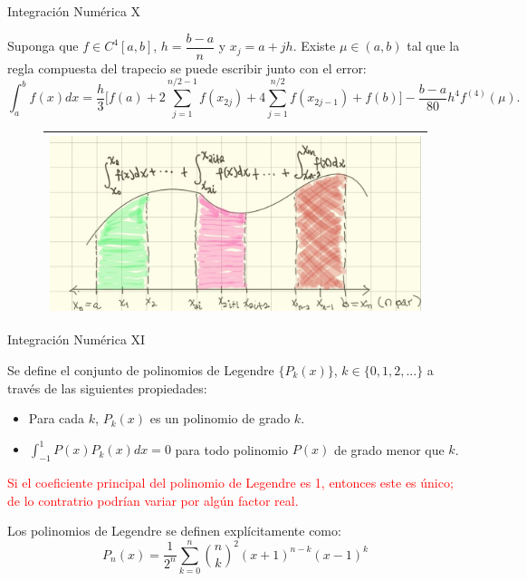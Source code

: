 \begin{frame}{Integración Numérica X}
\begin{Teo}
Suponga que $f\in C^4[a,b]$, $h=\dfrac{b-a}{n}$ y $x_j=a+jh$. Existe $\mu\in(a,b)$ tal que la regla compuesta del trapecio se puede escribir junto con el error:
$$\int_{a}^{b}f(x)dx=\dfrac{h}{3}\bigg[ 	f(a)+2\sum_{j=1}^{n/2-1}f(x_{2j})+4\sum_{j=1}^{n/2}f(x_{2j-1})+f(b)\bigg]-\dfrac{b-a}{80}h^4f^{(4)}(\mu).$$
\end{Teo}
\begin{figure}[H]
\centering
\begin{tabular}{|c|}
\hline
\includegraphics[scale=0.15]{Imagen11}\\
\hline
\end{tabular}
\end{figure}
\end{frame}
\begin{frame}{Integración Numérica XI}
\begin{Def}
Se define el conjunto de polinomios de Legendre $\{P_k(x)\}$, $k \in \{0,1,2,...\}$ a través de las siguientes propiedades:
\begin{itemize}
\item Para cada $k$, $P_k(x)$ es un polinomio de grado $k$.
\item $\displaystyle \int_{-1}^{1}P(x)P_k(x)dx=0 $ para todo polinomio $P(x)$ de grado menor que $k$. 
\end{itemize}
\end{Def}\pause
\textcolor{red}{Si el coeficiente principal del polinomio de Legendre es 1, entonces este es único; de lo contratrio podrían variar por algún factor real. }
\begin{Def}
Los polinomios de Legendre se definen explícitamente como:
$$P_n(x)=\dfrac{1}{2^n}\sum_{k=0}^{n}\binom{n}{k}^2(x+1)^{n-k}(x-1)^k$$
\end{Def}
\end{frame}
